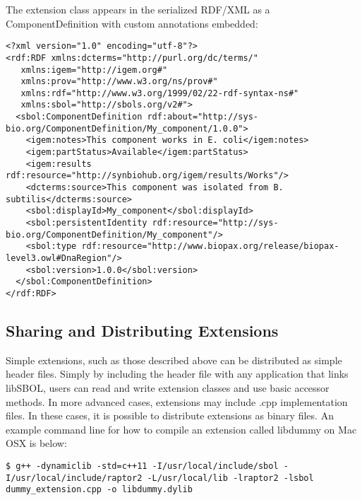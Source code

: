 The extension class appears in the serialized RDF/XML as a ComponentDefinition with  custom annotations embedded:

\vspace{\abovedisplayskip}
\begin{minipage}{0.95\textwidth} 
\begin{lstlisting}
<?xml version="1.0" encoding="utf-8"?>
<rdf:RDF xmlns:dcterms="http://purl.org/dc/terms/"
   xmlns:igem="http://igem.org#"
   xmlns:prov="http://www.w3.org/ns/prov#"
   xmlns:rdf="http://www.w3.org/1999/02/22-rdf-syntax-ns#"
   xmlns:sbol="http://sbols.org/v2#">
  <sbol:ComponentDefinition rdf:about="http://sys-bio.org/ComponentDefinition/My_component/1.0.0">
    <igem:notes>This component works in E. coli</igem:notes>
    <igem:partStatus>Available</igem:partStatus>
    <igem:results rdf:resource="http://synbiohub.org/igem/results/Works"/>
    <dcterms:source>This component was isolated from B. subtilis</dcterms:source>
    <sbol:displayId>My_component</sbol:displayId>
    <sbol:persistentIdentity rdf:resource="http://sys-bio.org/ComponentDefinition/My_component"/>
    <sbol:type rdf:resource="http://www.biopax.org/release/biopax-level3.owl#DnaRegion"/>
    <sbol:version>1.0.0</sbol:version>
  </sbol:ComponentDefinition>
</rdf:RDF>
\end{lstlisting}
\end{minipage}

\subsection*{Sharing and Distributing Extensions}
Simple extensions, such as those described above can be distributed as simple header files. Simply by including the header file with any application that links libSBOL, users can read and write extension classes and use basic accessor methods. In more advanced cases, extensions may include .cpp implementation files. In these cases, it is possible to distribute extensions as binary files. An example command line for how to compile an extension called libdummy on Mac OSX is below:

\vspace{\abovedisplayskip}
\begin{minipage}{0.95\textwidth} 
\begin{lstlisting}
$ g++ -dynamiclib -std=c++11 -I/usr/local/include/sbol -I/usr/local/include/raptor2 -L/usr/local/lib -lraptor2 -lsbol dummy_extension.cpp -o libdummy.dylib
\end{lstlisting}
\end{minipage}

